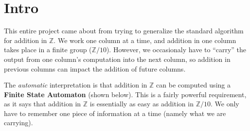 \documentclass[12pt]{article}
\theoremstyle{definition}
\newcommand{\Z}{\mathbb{Z}}
\begin{document}
  \section{Intro}

  This entire project came about from trying to generalize the standard
  algorithm for addition in $\Z$. We work one column at a time, and 
  addition in one column takes place in a finite group ($\Z / 10$).
  However, we occasionaly have to ``carry'' the output from one column's
  computation into the next column, so addition in previous columns can
  impact the addition of future columns.

  The \emph{automatic} interpretation is that addition in $\Z$ can be 
  computed using a \textbf{Finite State Automaton} (shown below). This is
  a fairly powerful requirement, as it says that addition in $\Z$ is 
  essentially as easy as addition in $\Z / 10$. We only have to remember
  one piece of information at a time (namely what we are carrying).
\end{document}
